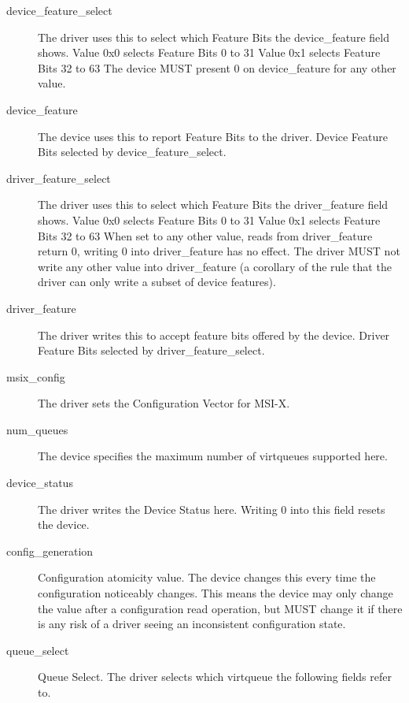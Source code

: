 \begin{description}
\item[device_feature_select]
        The driver uses this to select which Feature Bits the device_feature field shows.
        Value 0x0 selects Feature Bits 0 to 31
        Value 0x1 selects Feature Bits 32 to 63
        The device MUST present 0 on device_feature for any other value.

\item[device_feature]
        The device uses this to report Feature Bits to the driver.
        Device Feature Bits selected by device_feature_select.

\item[driver_feature_select]
        The driver uses this to select which Feature Bits the driver_feature field shows.
        Value 0x0 selects Feature Bits 0 to 31
        Value 0x1 selects Feature Bits 32 to 63
        When set to any other value, reads from driver_feature
        return 0, writing 0 into driver_feature has no effect.  The driver
        MUST not write any other value into driver_feature (a corollary of
        the rule that the driver can only write a subset of device features).

\item[driver_feature]
        The driver writes this to accept feature bits offered by the device.
        Driver Feature Bits selected by driver_feature_select.

\item[msix_config]
        The driver sets the Configuration Vector for MSI-X.

\item[num_queues]
        The device specifies the maximum number of virtqueues supported here.

\item[device_status]
        The driver writes the Device Status here. Writing 0 into this
        field resets the device.

\item[config_generation]
        Configuration atomicity value.  The device changes this every time the
        configuration noticeably changes.  This means the device may
        only change the value after a configuration read operation,
        but MUST change it if there is any risk of a driver seeing an
        inconsistent configuration state.

\item[queue_select]
        Queue Select. The driver selects which virtqueue the following
        fields refer to.


\end{description}
